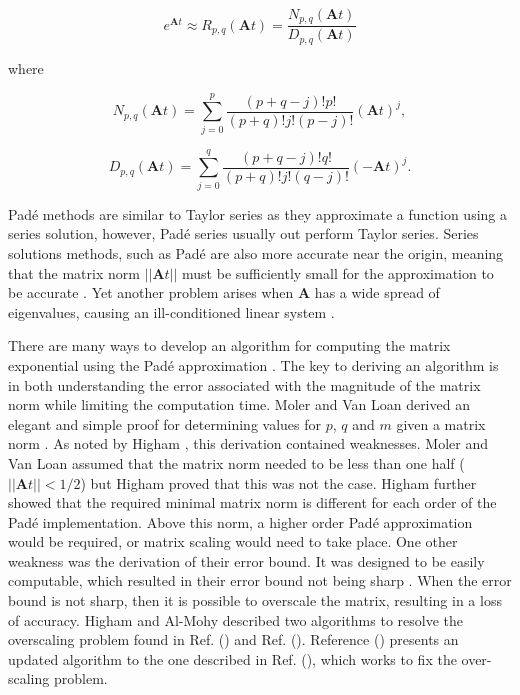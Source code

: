 \begin{equation}
    e^{\boldsymbol{A}t} \approx R_{p,q}(\boldsymbol{A}t) = \frac{N_{p,q}(\boldsymbol{A}t)}{D_{p,q}(\boldsymbol{A}t)}
    \label{eq:padeApprox}
\end{equation}

\noindent where

\begin{equation}
    N_{p,q}(\boldsymbol{A}t) = \sum_{j=0}^{p}\frac{(p + q - j)!p!}{(p + q)!j!(p - j)!}(\boldsymbol{A}t)^{j},
\end{equation}

\begin{equation}
    D_{p,q}(\boldsymbol{A}t) = \sum_{j=0}^{q}\frac{(p + q - j)!q!}{(p + q)!j!(q - j)!}(-\boldsymbol{A}t)^{j}.
\end{equation}

Pad\'e methods are similar to Taylor series as they approximate a function using a series solution, however, Pad\'e series usually out perform Taylor series. Series solutions methods, such as Pad\'e are also more accurate near the origin, meaning that the matrix norm $||\boldsymbol{A}t||$ must be sufficiently small for the approximation to be accurate \cite{pusa2010}. Yet another problem arises when $\boldsymbol{A}$ has a wide spread of eigenvalues, causing an ill-conditioned linear system  \cite{exokit} \cite{moler2003}. 

There are many ways to develop an algorithm for computing the matrix exponential using the Pad\'e approximation \cite{exokit} \cite{higham2005} \cite{higham2009}. The key to deriving an algorithm is in both understanding the error associated with the magnitude of the matrix norm while limiting the computation time. Moler and Van Loan derived an elegant and simple proof for determining values for $p$, $q$ and $m$ given a matrix norm \cite{moler2003}. As noted by Higham \cite{higham2005}, this derivation contained weaknesses. Moler and Van Loan assumed that the matrix norm needed to be less than one half ($||\boldsymbol{A}t|| < 1/2$) but Higham proved that this was not the case. Higham further showed that the required minimal matrix norm is different for each order of the Pad\'e implementation. Above this norm, a higher order Pad\'e approximation would be required, or matrix scaling would need to take place. One other weakness was the derivation of their error bound. It was designed to be easily computable, which resulted in their error bound not being sharp \cite{higham2005}. When the error bound is not sharp, then it is possible to overscale the matrix, resulting in a loss of accuracy. Higham and Al-Mohy described two algorithms to resolve the overscaling problem found in Ref. (\cite{higham2005}) and  Ref. (\cite{higham2009}). Reference (\cite{higham2009}) presents an updated algorithm to the one described in Ref. (\cite{higham2005}), which works to fix the over-scaling problem.


